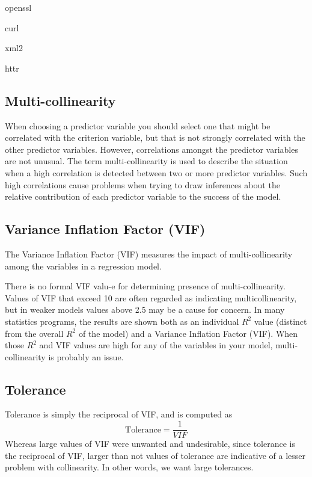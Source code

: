 openssl

curl

xml2

httr


\subsection{Multi-collinearity}
When choosing a predictor variable you should select one that might be correlated with the criterion variable, but that is not strongly correlated with the other predictor variables. However, correlations amongst the predictor variables are not unusual. The term multi-collinearity  is used to describe the situation
when a high correlation is detected between two or more predictor variables.
Such high correlations cause problems when trying to draw inferences about the relative contribution of each predictor variable to the success of the model. 

\subsection{Variance Inflation Factor (VIF)}



The Variance Inflation Factor (VIF) measures the impact of multi-collinearity among the variables in a regression model. 
     
There is no formal VIF valu-e for determining presence of multi-collinearity. Values of VIF that exceed 10 are often regarded as indicating multicollinearity, but in weaker models values above 2.5 may be a cause for concern. In many statistics programs, the results are shown both as an individual $R^2$ value (distinct from the overall $R^2$ of the model) and a Variance Inflation Factor (VIF). When those $R^2$ and VIF values are high for any of the variables in your model, multi-collinearity is probably an issue. 

     

\subsection{Tolerance}

Tolerance is simply the reciprocal of VIF, and is computed as
\[ \mbox{Tolerance} = \frac{1}{VIF}\]
Whereas large values of VIF were unwanted and undesirable, since tolerance is the reciprocal of VIF, larger than not values of tolerance are indicative of a lesser problem with collinearity. In other words, we want large tolerances.



